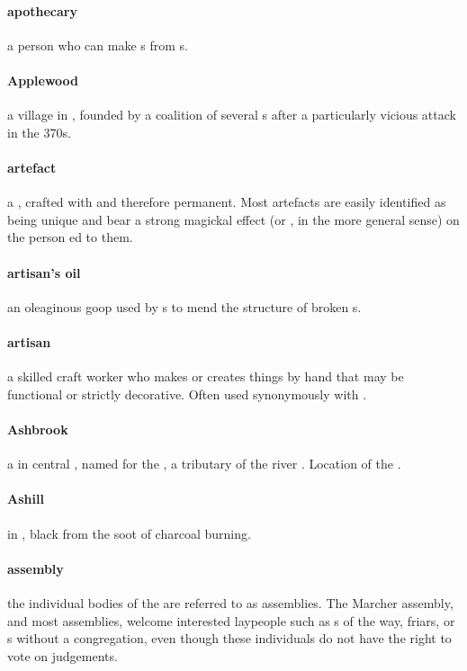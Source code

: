 \paragraph{apothecary} a person who can make s from s. 
\paragraph{Applewood} a village in , founded by a coalition of several s after a particularly vicious  attack in the 370s.
\paragraph{artefact} a , crafted with  and therefore permanent. Most artefacts are easily identified as being unique and bear a strong magickal effect (or , in the more general sense) on the person ed to them.
\paragraph{artisan's oil} an oleaginous goop used by s to mend the structure of broken s.
\paragraph{artisan} a skilled craft worker who makes or creates things by hand that may be functional or strictly decorative. Often used synonymously with .
\paragraph{Ashbrook} a  in central , named for the , a tributary of the river . Location of the .
\paragraph{Ashill}  in , black from the soot of charcoal burning.
\paragraph{assembly} the individual bodies of the  are referred to as assemblies. The Marcher assembly, and most  assemblies, welcome interested laypeople such as s of the way, friars, or s without a congregation, even though these individuals do not have the right to vote on judgements.
